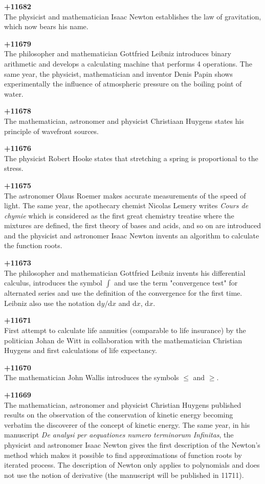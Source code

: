 \textbf{+11682}\\
The physicist and mathematician Isaac Newton establishes the law of gravitation, which now bears his name.

\textbf{+11679}\\
The philosopher and mathematician Gottfried Leibniz introduces binary arithmetic and develops a calculating machine that performs 4 operations. The same year, the physicist, mathematician and inventor Denis Papin shows experimentally the influence of atmospheric pressure on the boiling point of water.

\textbf{+11678}\\
The mathematician, astronomer and physicist Christiaan Huygens states his principle of wavefront sources.

\textbf{+11676}\\
The physicist Robert Hooke states that stretching a spring is proportional to the stress.

\textbf{+11675}\\
The astronomer Olaus Roemer makes accurate measurements of the speed of light. The same year, the apothecary chemist Nicolas Lemery writes \textit{Cours de chymie} which is considered as the first great chemistry treatise where the mixtures are defined, the first theory of bases and acids, and so on are introduced and the physicist and astronomer Isaac Newton invents an algorithm to calculate the function roots.

\textbf{+11673}\\
The philosopher and mathematician Gottfried Leibniz invents his differential calculus, introduces the symbol $\int$ and use the term "convergence test" for alternated series and use the definition of the convergence for the first time. Leibniz also use the notation $\mathrm{d}y/\mathrm{d}x$ and $\mathrm{d}x$, $\mathrm{d}x$.

\textbf{+11671}\\
First attempt to calculate life annuities (comparable to life insurance) by the politician Johan de Witt in collaboration with the mathematician Christian Huygens and first calculations of life expectancy.

\textbf{+11670}\\
The mathematician John Wallis introduces the symbols $\le$ and $\ge$.

\textbf{+11669}\\
The mathematician, astronomer and physicist Christian Huygens published results on the observation of the conservation of kinetic energy becoming verbatim the discoverer of the concept of kinetic energy. The same year, in his manuscript \textit{De analysi per aequationes numero terminorum Infinitas}, the physicist and astronomer Isaac Newton gives the first description of the Newton's method which makes it possible to find approximations of function roots by iterated process. The description of Newton only applies to polynomials and does not use the notion of derivative (the manuscript will be published in 11711).

